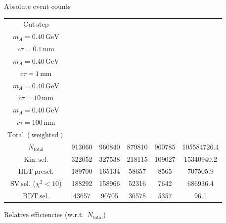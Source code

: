 \documentclass[10pt,a4paper]{article}
\renewcommand{\arraystretch}{1.4}
\begin{document}
{\footnotesize\setlength{\tabcolsep}{4pt}\renewcommand{\arraystretch}{1.05}%
\vspace{12pt}

Absolute event counts

\begin{tabular}{cccccc}
\toprule
$\mathrm{Cut\ step}$ & \shortstack{$m_{\pi}=4\,\mathrm{GeV}$\\$m_{A}=0.40\,\mathrm{GeV}$\\$c\tau=0.1\,\mathrm{mm}$} & \shortstack{$m_{\pi}=4\,\mathrm{GeV}$\\$m_{A}=0.40\,\mathrm{GeV}$\\$c\tau=1\,\mathrm{mm}$} & \shortstack{$m_{\pi}=4\,\mathrm{GeV}$\\$m_{A}=0.40\,\mathrm{GeV}$\\$c\tau=10\,\mathrm{mm}$} & \shortstack{$m_{\pi}=4\,\mathrm{GeV}$\\$m_{A}=0.40\,\mathrm{GeV}$\\$c\tau=100\,\mathrm{mm}$} & \shortstack{$\mathrm{QCD}$\\$\mathrm{Total\ (weighted)}$} \\
\midrule
$N_{\mathrm{total}}$ & 913060 & 960840 & 879810 & 960785 & 105584726.4\\
$\mathrm{Kin.\ sel.}$ & 322052 & 327538 & 218115 & 109027 & 15340940.2\\
$\mathrm{HLT\ presel.}$ & 189700 & 165134 & 58657 & 8565 & 707505.9\\
$\mathrm{SV\ sel.}$ ($\chi^2{<}10$) & 188292 & 158966 & 52316 & 7642 & 686936.4\\
$\mathrm{BDT\ sel.}$ & 43657 & 90705 & 36578 & 5357 & 96.1\\
\bottomrule
\end{tabular}

\vspace{18pt}

Relative efficiencies (w.r.t.\ $N_{\mathrm{total}}$)

}
\end{document}
